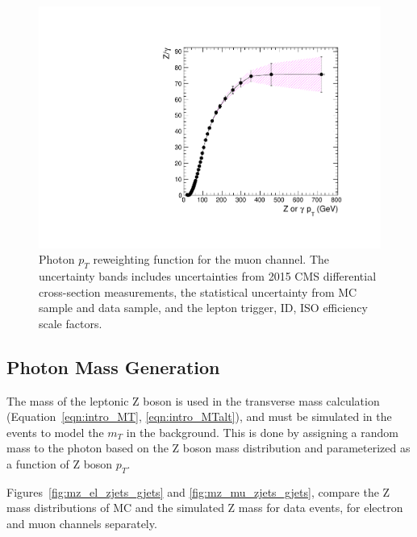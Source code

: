 \begin{figure}[htbp]
\centering
  \includegraphics[width=0.9\linewidth]{figures/study_gjets_data_allcorV2_modify_mu.pdf}
  \caption{Photon $p_T$ reweighting function for the muon channel.
 The uncertainty bands includes uncertainties from 2015 CMS \Zjets differential cross-section measurements, the statistical uncertainty from \Zjets MC sample and \gjets data sample, and the lepton trigger, ID, ISO efficiency scale factors.}
  \label{fig:photon_pt_weight_mu}
\end{figure}

\subsection{Photon Mass Generation}\label{sec:gjetm}
The mass of the leptonic Z boson is used in the transverse mass calculation (Equation~\ref{eqn:intro_MT}, \ref{eqn:intro_MTalt}), and must be simulated in the \gjets events to model the $m_T$ in the \Zjets background. This is done by assigning a random mass to the photon based on the Z boson mass distribution and parameterized as a function of Z boson $p_T$.

\vspace{0.3cm}
Figures~\ref{fig:mz_el_zjets_gjets} and \ref{fig:mz_mu_zjets_gjets}, compare the Z mass distributions of \Zjets MC and the simulated Z mass for \gjets data events, for electron and muon channels separately.

